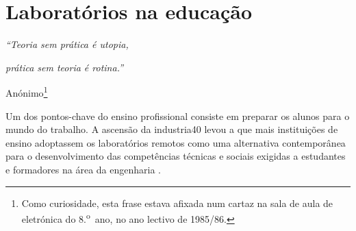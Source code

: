 
\section{Laboratórios na educação}
\label{Laboratóriosnaeducação}

\begin{center}
    \textit{``Teoria sem prática é utopia,}

    \textit{prática sem teoria é rotina.''}

    Anónimo\footnote{Como curiosidade, esta frase estava afixada num cartaz na sala de aula de eletrónica do 8.\textsuperscript{o}~ano, no ano lectivo de 1985/86.}

\end{center}
Um dos pontos-chave do ensino profissional consiste em preparar os alunos para o mundo do trabalho. A ascensão da \gls{industria40} levou a que mais instituições de ensino adoptassem os laboratórios remotos como uma alternativa contemporânea para o desenvolvimento das competências técnicas e sociais exigidas a estudantes e formadores na área da engenharia \cite{EvaluationRemoteVirtualE-Learning}.


